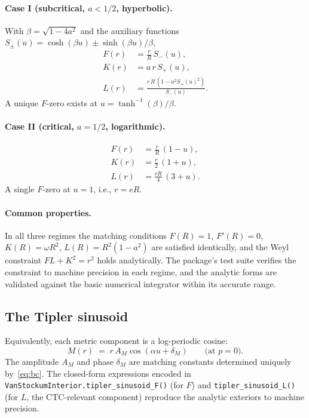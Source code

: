 \documentclass[11pt,a4paper]{article}
\begin{document}
\paragraph{Case I (subcritical, $a < 1/2$, hyperbolic).}
With $\beta = \sqrt{1 - 4 a^2}$ and the auxiliary functions
$S_\pm(u) = \cosh(\beta u) \pm \sinh(\beta u)/\beta$,
\begin{align}
F(r) &= \tfrac{r}{R}\,S_-(u), \\
K(r) &= a\,r\,S_+(u), \\
L(r) &= \tfrac{r\,R\,(1 - a^2 S_+(u)^2)}{S_-(u)}.
\end{align}
A unique $F$-zero exists at $u = \tanh^{-1}(\beta) / \beta$.

\paragraph{Case II (critical, $a = 1/2$, logarithmic).}
\begin{align}
F(r) &= \tfrac{r}{R}\,(1 - u), \\
K(r) &= \tfrac{r}{2}\,(1 + u), \\
L(r) &= \tfrac{r R}{4}\,(3 + u).
\end{align}
A single $F$-zero at $u = 1$, i.e., $r = e R$.

\paragraph{Common properties.}
In all three regimes the matching conditions $F(R) = 1$, $F'(R) = 0$,
$K(R) = \omega R^2$, $L(R) = R^2(1 - a^2)$ are satisfied identically,
and the Weyl constraint $F L + K^2 = r^2$ holds analytically. The
package's test suite verifies the constraint to machine precision in
each regime, and the analytic forms are validated against the basic
numerical integrator within its accurate range.

\subsection{The Tipler sinusoid}

Equivalently, each metric component is a log-periodic cosine:
\begin{equation}
\label{eq:tipler-sinusoid}
M(r) \;=\; r \, A_M \cos(\alpha u + \delta_M)
\qquad\text{(at $p = 0$)}.
\end{equation}
The amplitude $A_M$ and phase $\delta_M$ are matching constants
determined uniquely by~\eqref{eq:bc}. The closed-form expressions
encoded in \texttt{VanStockumInterior.tipler\_sinusoid\_F()} (for $F$)
and \texttt{tipler\_sinusoid\_L()} (for $L$, the CTC-relevant
component) reproduce the analytic exteriors to machine precision.
\end{document}
